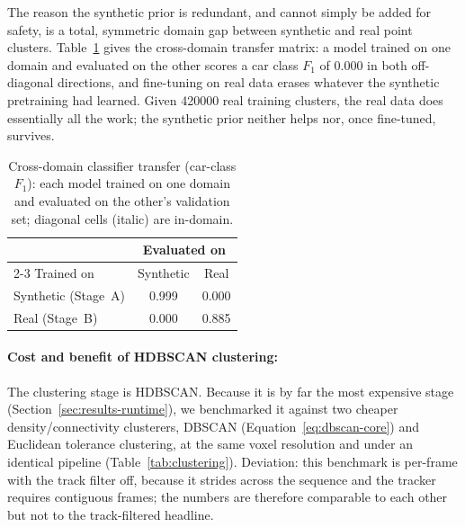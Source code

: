 The reason the synthetic prior is redundant, and cannot simply be added for
safety, is a total, symmetric domain gap between synthetic and real point
clusters. Table~\ref{tab:cross-domain} gives the cross-domain
transfer matrix: a model trained on one domain and evaluated on the other scores
a car class $F_1$ of \num{0.000} in both off-diagonal directions, and
fine-tuning on real data erases whatever the synthetic pretraining had learned.
Given \num{420000} real training clusters, the real data does essentially all the
work; the synthetic prior neither helps nor, once fine-tuned, survives.

\begin{table}[H]
  \centering
  \caption[Cross-domain classifier transfer]{Cross-domain classifier transfer (car-class
    $F_1$): each model trained on one domain and evaluated on the other's validation set;
    diagonal cells (italic) are in-domain.}
  \label{tab:cross-domain}
  \begin{tabular}{lcc}
    \toprule
    & \multicolumn{2}{c}{Evaluated on} \\
    \cmidrule(lr){2-3}
    Trained on & Synthetic & Real \\
    \midrule
    Synthetic (Stage~A) & 0.999 & 0.000 \\
    Real (Stage~B)      & 0.000        & 0.885 \\
    \bottomrule
  \end{tabular}
\end{table}

\paragraph{Cost and benefit of HDBSCAN clustering:}
\label{sec:ablation-clustering}

The clustering stage is HDBSCAN. Because it is by far the most expensive stage
(Section~\ref{sec:results-runtime}), we benchmarked it against two cheaper
density/connectivity clusterers, DBSCAN (Equation~\eqref{eq:dbscan-core}) and Euclidean
tolerance clustering,
at the same voxel resolution and under an identical pipeline
(Table~\ref{tab:clustering}). Deviation: this benchmark is
per-frame with the track filter off, because it strides across the
sequence and the tracker requires contiguous frames; the numbers are therefore
comparable to each other but not to the track-filtered headline.

